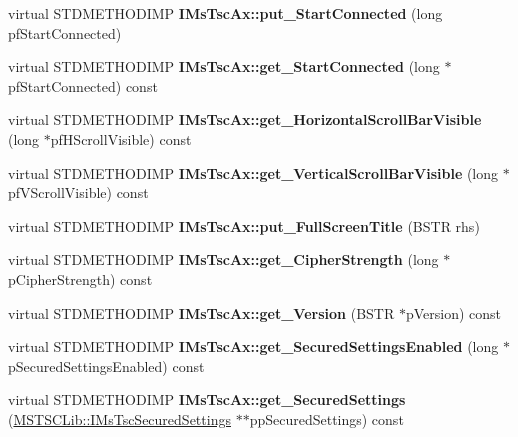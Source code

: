 \begin{DoxyCompactItemize}
virtual S\+T\+D\+M\+E\+T\+H\+O\+D\+I\+MP {\bfseries I\+Ms\+Tsc\+Ax\+::put\+\_\+\+Start\+Connected} (long pf\+Start\+Connected)
\item 
\mbox{\label{class_s_e_a_l_e_d___a6868bf1b04c4958bcb2f3e5fa0270708}} 
virtual S\+T\+D\+M\+E\+T\+H\+O\+D\+I\+MP {\bfseries I\+Ms\+Tsc\+Ax\+::get\+\_\+\+Start\+Connected} (long $\ast$pf\+Start\+Connected) const
\item 
\mbox{\label{class_s_e_a_l_e_d___ae7212cbd81f38d861c273a916af00d58}} 
virtual S\+T\+D\+M\+E\+T\+H\+O\+D\+I\+MP {\bfseries I\+Ms\+Tsc\+Ax\+::get\+\_\+\+Horizontal\+Scroll\+Bar\+Visible} (long $\ast$pf\+H\+Scroll\+Visible) const
\item 
\mbox{\label{class_s_e_a_l_e_d___a239494f7ef22399c63f8bda852d38de2}} 
virtual S\+T\+D\+M\+E\+T\+H\+O\+D\+I\+MP {\bfseries I\+Ms\+Tsc\+Ax\+::get\+\_\+\+Vertical\+Scroll\+Bar\+Visible} (long $\ast$pf\+V\+Scroll\+Visible) const
\item 
\mbox{\label{class_s_e_a_l_e_d___ac823626611d3e634e41b864e790b4f43}} 
virtual S\+T\+D\+M\+E\+T\+H\+O\+D\+I\+MP {\bfseries I\+Ms\+Tsc\+Ax\+::put\+\_\+\+Full\+Screen\+Title} (B\+S\+TR rhs)
\item 
\mbox{\label{class_s_e_a_l_e_d___a63474d7d269a567d56ec326f61842543}} 
virtual S\+T\+D\+M\+E\+T\+H\+O\+D\+I\+MP {\bfseries I\+Ms\+Tsc\+Ax\+::get\+\_\+\+Cipher\+Strength} (long $\ast$p\+Cipher\+Strength) const
\item 
\mbox{\label{class_s_e_a_l_e_d___a1f9ba401e077d01a58b4c64e807d0391}} 
virtual S\+T\+D\+M\+E\+T\+H\+O\+D\+I\+MP {\bfseries I\+Ms\+Tsc\+Ax\+::get\+\_\+\+Version} (B\+S\+TR $\ast$p\+Version) const
\item 
\mbox{\label{class_s_e_a_l_e_d___a5d7e3de97d96c64b480541d6e95c5191}} 
virtual S\+T\+D\+M\+E\+T\+H\+O\+D\+I\+MP {\bfseries I\+Ms\+Tsc\+Ax\+::get\+\_\+\+Secured\+Settings\+Enabled} (long $\ast$p\+Secured\+Settings\+Enabled) const
\item 
\mbox{\label{class_s_e_a_l_e_d___a16c5f2aacfde6a5814b46fb93d1cbfa2}} 
virtual S\+T\+D\+M\+E\+T\+H\+O\+D\+I\+MP {\bfseries I\+Ms\+Tsc\+Ax\+::get\+\_\+\+Secured\+Settings} (\hyperlink{interface_m_s_t_s_c_lib_1_1_i_ms_tsc_secured_settings}{M\+S\+T\+S\+C\+Lib\+::\+I\+Ms\+Tsc\+Secured\+Settings} $\ast$$\ast$pp\+Secured\+Settings) const
$$
\end{DoxyCompactItemize}
